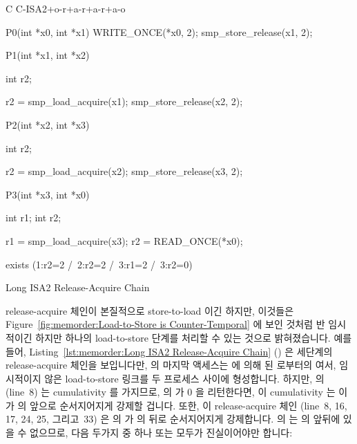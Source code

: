 \begin{listing}[tbp]
{ \scriptsize
\begin{verbbox}[\LstLineNo]
C C-ISA2+o-r+a-r+a-r+a-o
{
}

P0(int *x0, int *x1)
{
  WRITE_ONCE(*x0, 2);
  smp_store_release(x1, 2);
}


P1(int *x1, int *x2)
{
  int r2;

  r2 = smp_load_acquire(x1);
  smp_store_release(x2, 2);
}

P2(int *x2, int *x3)
{
  int r2;

  r2 = smp_load_acquire(x2);
  smp_store_release(x3, 2);
}

P3(int *x3, int *x0)
{
  int r1;
  int r2;

  r1 = smp_load_acquire(x3);
  r2 = READ_ONCE(*x0);
}

exists (1:r2=2 /\ 2:r2=2 /\ 3:r1=2 /\ 3:r2=0)
\end{verbbox}
}
\centering
\theverbbox
\caption{Long ISA2 Release-Acquire Chain}
\label{lst:memorder:Long ISA2 Release-Acquire Chain}
\end{listing}

release-acquire 체인이 본질적으로 store-to-load 이긴 하지만, 이것들은
Figure~\ref{fig:memorder:Load-to-Store is Counter-Temporal}
에 보인 것처럼 반 임시적이긴 하지만 하나의 load-to-store 단계를 처리할 수 있는
것으로 밝혀졌습니다.
예를 들어,
Listing~\ref{lst:memorder:Long ISA2 Release-Acquire Chain}
()
은 세단계의 release-acquire 체인을 보입니다만,  의 마지막 액세스는
 에 의해  된  로부터의  여서,
임시적이지 않은 load-to-store 링크를 두 프로세스 사이에 형성합니다.
하지만,  의  (line~8) 는 cumulativity 를
가지므로,  의  가 0 을 리턴한다면, 이 cumulativity 는
이  가  의  앞으로
순서지어지게 강제할 겁니다.
또한, 이 release-acquire 체인 (line~8, 16, 17, 24, 25, 그리고~33) 은 
의  가  의  뒤로 순서지어지게
강제합니다.
 의  는  의  앞뒤에
있을 수 없으므로, 다음 두가지 중 하나 또는 모두가 진실이어야만 합니다:
\iffalse

